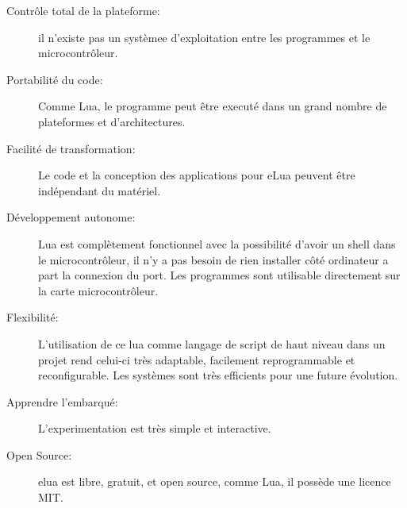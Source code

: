 \begin{description}

 \item[Contrôle total de la plateforme:] il n'existe pas un systèmee d'exploitation entre les programmes et le microcontrôleur.

 \item[Portabilité du code:] Comme Lua, le programme peut être executé dans un grand nombre de plateformes et d'architectures.

 \item[Facilité de transformation:] Le code et la conception des applications pour eLua peuvent être indépendant du matériel.

 \item[Développement autonome:] Lua est complètement fonctionnel avec la possibilité d'avoir un shell dans le microcontrôleur, il n'y a pas besoin
de rien installer côté ordinateur a part la connexion du port. Les programmes sont utilisable directement sur la carte microcontrôleur.

 \item[Flexibilité:] L'utilisation de ce lua comme langage de script de haut niveau dans un projet rend celui-ci très adaptable, facilement
reprogrammable et reconfigurable. Les systèmes sont très efficients pour une future évolution.

 \item[Apprendre l'embarqué: ] L'experimentation est très simple et interactive.

 \item[Open Source:] elua est libre, gratuit, et open source, comme Lua, il possède une licence MIT.
\end{description}




